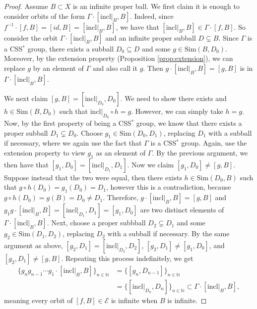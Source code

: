 \documentclass[12pt]{amsart}
\numberwithin{equation}{subsection}
\theoremstyle{definition}
\theoremstyle{definition}
\theoremstyle{remark}
\begin{document}
\begin{proof}

    Assume $B \subset X$ is an infinite proper ball. We first claim it is enough to consider orbits of the form $\Gamma \cdot [\text{incl}\vert_{B}, B]$. Indeed, since $f^{-1} \cdot [f, B] = [id, B] = [\text{incl}\vert_B,B]$, we have that $[\text{incl}\vert_B,B] \in \Gamma \cdot [f,B]$. So consider the orbit $\Gamma \cdot [\text{incl}\vert_{B}, B]$ and an infinite proper subball $D \subsetneq B$. Since $\Gamma$ is a CSS$^*$ group, there exists a subball $D_0 \subseteq D$ and some $g \in \text{Sim}(B,D_0)$. Moreover, by the extension property (Proposition \ref{prop:extension}), we can replace $g$ by an element of $\Gamma$ and also call it $g$. Then $g \cdot [\text{incl}\vert_{B}, B] = [g, B]$ is in $\Gamma \cdot [\text{incl}\vert_{B}, B]$. 
    
    We next claim $[g,B]= [\text{incl}\vert_{D_0}, D_0]$. We need to show there exists and $h \in \text{Sim}(B, D_0)$ such that $\text{incl}\vert_{D_0} \circ h = g$. However, we can simply take $h =g $. Now, by the first property of being a CSS$^*$ group, we know that there exists a proper subball $D_1 \subsetneq D_0$. Choose $g_1 \in \text{Sim}(D_0, D_1)$, replacing $D_1$ with a subball if necessary, where we again use the fact that $\Gamma$ is a CSS$^*$ group. Again, use the extension property to view $g_1$ as an element of $\Gamma$. By the previous argument, we then have that $[g_1,D_0]= [\text{incl}\vert_{D_1}, D_1]$. Now we claim $[g_1,D_0] \neq [g,B]$. Suppose instead that the two were equal, then there exists $h \in \text{Sim}(D_0,B)$ such that $g \circ h (D_0) = g_1(D_0) = D_1$, however this is a contradiction, because $g\circ h(D_0) = g(B) = D_0 \neq D_1$. Therefore, $g\cdot[\text{incl}\vert_B,B] = [g,B]$ and $g_1g\cdot[\text{incl}\vert_B,B] = [\text{incl}\vert_{D_1},D_1] = [g_1,D_0]$ are two distinct elements of $\Gamma \cdot [\text{incl}\vert_{B}, B]$. Next, choose a proper subbball $D_2 \subsetneq D_1$ and some $g_2 \in \text{Sim}(D_1, D_2)$, replacing $D_2$ with a subball if necessary. By the same argument as above, $[g_2,D_1] = [\text{incl}\vert_{D_2},D_2]$, $[g_2,D_1] \neq [g_1,D_0]$, and $[g_2,D_1] \neq [g,B]$. Repeating this process indefinitely, we get 
    \begin{align*}
       \{ g_ng_{n-1}\cdots g_1\cdot [\text{incl}\vert_B,B]\}_{n \in \mathbb N} & = \{ [g_n,D_{n-1}]\}_{n \in \mathbb N} \\
       & = \{ [\text{incl}\vert_{D_n}, D_n] \}_{n \in \mathbb N} \subset \Gamma \cdot [\text{incl}\vert_{B}, B], 
    \end{align*}
    meaning every orbit of $ [f,B] \in \mathcal E$ is infinite when $B$ is infinite. 


\end{proof}
\end{document}
